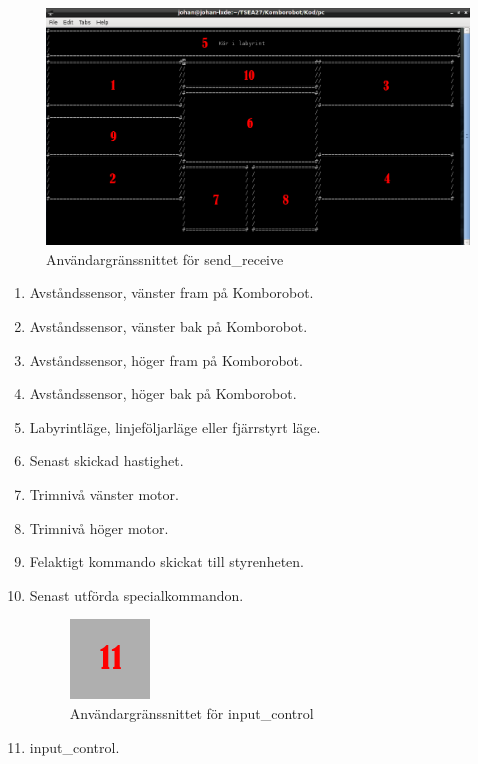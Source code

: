 \begin{figure}[H]
        \centering
        \includegraphics[scale=0.5]{bilder/granssnitt.png}
        \caption{Användargränssnittet för send\_receive}
        \label{fig:sendrec}
\end{figure}
\begin{enumerate}
\item Avståndssensor, vänster fram på Komborobot.
\item Avståndssensor, vänster bak på Komborobot.
\item Avståndssensor, höger fram på Komborobot.
\item Avståndssensor, höger bak på Komborobot.
\item Labyrintläge, linjeföljarläge eller fjärrstyrt läge.
\item Senast skickad hastighet.
\item Trimnivå vänster motor.
\item Trimnivå höger motor.
\item Felaktigt kommando skickat till styrenheten.
\item Senast utförda specialkommandon.

\begin{figure}[H]
        \centering
        \includegraphics[scale=0.5]{bilder/input_control.png}
        \caption{Användargränssnittet för input\_control}
        \label{fig:inputcont}
\end{figure}

\item input\_control.

\end{enumerate}
